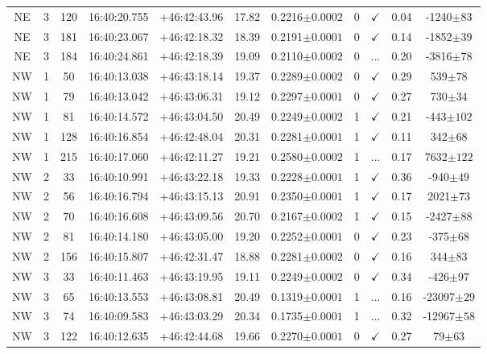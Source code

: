 \begin{table*}
\begin{tabular}{ccccccccccc}
NE & 3 & 120 & 16:40:20.755 & +46:42:43.96 & 17.82 & 0.2216$\pm{0.0002}$ & 0 & $\checkmark$ & 0.04 & -1240$\pm{83}$ \\
NE & 3 & 181 & 16:40:23.067 & +46:42:18.32 & 18.39 & 0.2191$\pm{0.0001}$ & 0 & $\checkmark$ & 0.14 & -1852$\pm{39}$ \\
NE & 3 & 184 & 16:40:24.861 & +46:42:18.39 & 19.09 & 0.2110$\pm{0.0002}$ & 0 & ... & 0.20 & -3816$\pm{78}$ \\
NW & 1 & 50 & 16:40:13.038 & +46:43:18.14 & 19.37 & 0.2289$\pm{0.0002}$ & 0 & $\checkmark$ & 0.29 & 539$\pm{78}$ \\
NW & 1 & 79 & 16:40:13.042 & +46:43:06.31 & 19.12 & 0.2297$\pm{0.0001}$ & 0 & $\checkmark$ & 0.27 & 730$\pm{34}$ \\
NW & 1 & 81 & 16:40:14.572 & +46:43:04.50 & 20.49 & 0.2249$\pm{0.0002}$ & 1 & $\checkmark$ & 0.21 & -443$\pm{102}$ \\
NW & 1 & 128 & 16:40:16.854 & +46:42:48.04 & 20.31 & 0.2281$\pm{0.0001}$ & 1 & $\checkmark$ & 0.11 & 342$\pm{68}$ \\
NW & 1 & 215 & 16:40:17.060 & +46:42:11.27 & 19.21 & 0.2580$\pm{0.0002}$ & 1 & ... & 0.17 & 7632$\pm{122}$ \\
NW & 2 & 33 & 16:40:10.991 & +46:43:22.18 & 19.33 & 0.2228$\pm{0.0001}$ & 1 & $\checkmark$ & 0.36 & -940$\pm{49}$ \\
NW & 2 & 56 & 16:40:16.794 & +46:43:15.13 & 20.91 & 0.2350$\pm{0.0001}$ & 1 & $\checkmark$ & 0.17 & 2021$\pm{73}$ \\
NW & 2 & 70 & 16:40:16.608 & +46:43:09.56 & 20.70 & 0.2167$\pm{0.0002}$ & 1 & $\checkmark$ & 0.15 & -2427$\pm{88}$ \\
NW & 2 & 81 & 16:40:14.180 & +46:43:05.00 & 19.20 & 0.2252$\pm{0.0001}$ & 0 & $\checkmark$ & 0.23 & -375$\pm{68}$ \\
NW & 2 & 156 & 16:40:15.807 & +46:42:31.47 & 18.88 & 0.2281$\pm{0.0002}$ & 0 & $\checkmark$ & 0.16 & 344$\pm{83}$ \\
NW & 3 & 33 & 16:40:11.463 & +46:43:19.95 & 19.11 & 0.2249$\pm{0.0002}$ & 0 & $\checkmark$ & 0.34 & -426$\pm{97}$ \\
NW & 3 & 65 & 16:40:13.553 & +46:43:08.81 & 20.49 & 0.1319$\pm{0.0001}$ & 1 & ... & 0.16 & -23097$\pm{29}$ \\
NW & 3 & 74 & 16:40:09.583 & +46:43:03.29 & 20.34 & 0.1735$\pm{0.0001}$ & 1 & ... & 0.32 & -12967$\pm{58}$ \\
NW & 3 & 122 & 16:40:12.635 & +46:42:44.68 & 19.66 & 0.2270$\pm{0.0001}$ & 0 & $\checkmark$ & 0.27 & 79$\pm{63}$ \\

\end{tabular}
\end{table*}
